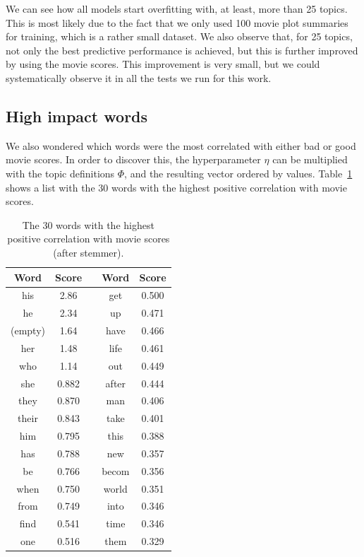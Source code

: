 \documentclass{article} %
\begin{document}
We can see how all models start overfitting with, at least, more than 25 topics.
This is most likely due to the fact that we only used 100 movie plot summaries for training, which is a rather small dataset. 
We also observe that, for 25 topics, not only the best predictive performance is achieved, but this is further improved by using the movie scores.
This improvement is very small, but we could systematically observe it in all the tests we run for this work. 

\subsection{High impact words}

We also wondered which words were the most correlated with either bad or good movie scores. In order to discover this, the hyperparameter \(\eta\) can be multiplied with the topic definitions \(\Phi\), and the resulting vector ordered by values. Table~\ref{table:word_scores} shows a list with the 30 words with the highest positive correlation with movie scores.

\begin{table}[ht!]
\captionsetup{justification=centering}
\caption{The 30 words with the highest positive correlation with movie scores (after stemmer).}
\label{table:word_scores}
\begin{center}
\begin{tabular}{c|ccc|c}
Word & Score  & \hspace*{1cm} & Word & Score \\ \hline
his &	 2.86 &&	get &	 0.500 \\
he &	 2.34 &&	up &	 0.471 \\
(empty) &1.64 &&	have &	 0.466 \\
her &	 1.48 &&	life &	 0.461 \\
who &	 1.14 &&	out &	 0.449 \\
she &	 0.882 &&	after &	 0.444 \\
they &	 0.870 &&	man &	 0.406 \\
their &	 0.843 &&	take &	 0.401 \\
him &	 0.795 &&	this &	 0.388 \\
has &	 0.788 &&	new &	 0.357 \\
be &	 0.766 &&	becom &	 0.356 \\
when &	 0.750 &&	world &	 0.351 \\
from &	 0.749 &&	into &	 0.346 \\
find &	 0.541 &&	time &	 0.346 \\
one &	 0.516 &&	them &	 0.329
\end{tabular}
\end{center}
\end{table}
\end{document}
